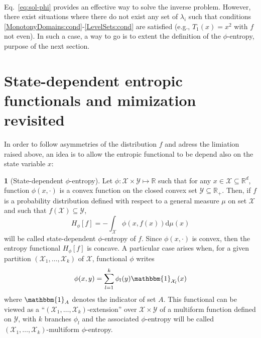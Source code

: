 \documentclass[english,sort&compress]{elsarticle}
\theoremstyle{definition}
\newtheorem{defn}{\protect\definitionname}
\theoremstyle{plain}
\theoremstyle{plain}
\providecommand{\definitionname}{Definition}
\def\dmu{\mathrm{d}\mu}
\def\Rset{\mathbb{R}}
\def\X{\mathcal{X}}
\def\Y{\mathcal{Y}}
\def\un{\mathbbm{1}}
\begin{document}
\

Eq.~\eqref{eq:sol-phi}  provides   an  effective   way  to  solve   the  inverse
problem. However,  there exist situations  where there do  not exist any  set of
$\lambda_i$ such that conditions \ref{MonotonyDomains:cond}-\ref{LevelSets:cond}
are satisfied (e.g., $T_1(x)  = x^2$ with $f$ not even).  In  such a case, a way
to go  is to extent  the definition of  the $\phi$-entropy, purpose of  the next
section.





\section{State-dependent entropic functionals and mimization revisited}
\label{sec:MultiformEnt}

In order to follow asymmetries of  the distribution $f$ and adress the limiation
raised above, an idea  is to allow the entropic functional to  be depend also on
the state variable $x$:
%
\begin{defn}[State-dependent $\phi$-entropy]\label{def:asym_phi-entropy}
  Let $\phi: \X \times  \Y \mapsto \Rset$ such that for any  $x \in \X \subseteq
  \Rset^d$, function $\phi(x,\cdot)$  is a convex function on  the closed convex
  set  $\Y \subseteq  \Rset_+$.   Then,  if $f$  is  a probability  distribution
  defined with  respect to  a general measure  $\mu$ on  set $\X$ and  such that
  $f(\X) \subseteq \Y$,
  \begin{equation}\label{eq:asym_phi-entropy}
    H_\phi[f] = - \int_\X \phi(x,f(x)) \dmu(x)
  \end{equation}
  will be  called state-dependent $\phi$-entropy of  $f$.  Since $\phi(x,\cdot)$
  is convex, then the entropy functional $H_\phi[f]$ is concave.
  A particular case arises when, for  a given partition $(\X_1 , \ldots , \X_k)$
  of $\X$, functional $\phi$ writes
  \begin{equation}\label{eq:multiform_phi-entropy}
    \phi(x,y) = \sum_{l=1}^k \phi_l(y) \un_{\X_l}(x)
  \end{equation}
  where $\un_A$ denotes the indicator of set $A$.  This functional can be viewed
  as a ``$(\X_1 , \ldots , \X_k)$-extension'' over $\X \times \Y$ of a multiform
  function  defined on  $\Y$,  with  $k$ branches  $\phi_l$  and the  associated
  $\phi$-entropy   will   be  called   $(\X_1   ,   \ldots  ,   \X_k)$-multiform
  $\phi$-entropy.
\end{defn}
\end{document}
